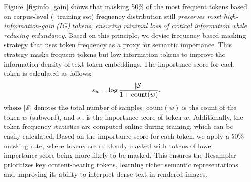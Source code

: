Figure~\ref{fig:info_gain} shows that masking 50\% of the most frequent tokens based on corpus-level (\ie, training set) frequency distribution still \textit{preserves most high-information-gain (IG) tokens, ensuring minimal loss of critical information while reducing redundancy}.
Based on this principle, we devise frequency-based masking strategy that uses token frequency as a proxy for semantic importance.  
This strategy masks frequent tokens but low-information tokens to improve the information density of text token embeddings. 
The importance score for each token is calculated as follows: 
\vspace{-2pt}
\begin{equation}
s_w = \log \frac{|\mathcal{S}|}{1+\text{count}(w)},
\label{eq:important_score}
\vspace{-2pt}
\end{equation}
where $|\mathcal{S}|$ denotes the total number of samples, $\text{count}(w)$ is the count of the token $w$ (subword), and $s_w$ is the importance score of token $w$. 
Additionally, the token frequency statistics are computed online during training, which can be easily calculated. 
Based on the importance score for each token, we apply a 50\% masking rate, where tokens are randomly masked with tokens of lower importance score being more likely to be masked. 
This ensures the Resampler prioritizes key content-bearing tokens, learning richer semantic representations and improving its ability to interpret dense text in rendered images.
